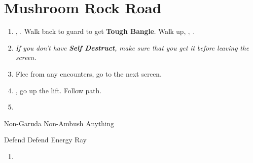 \chapter{Mushroom Rock Road}

\begin{enumerate}
	\item \sd, \cs. Walk back to guard to get \textbf{Tough Bangle}. Walk up, \sd, \sd.
	\item \textit{If you don't have \textbf{Self Destruct}, make sure that you get it before leaving the screen.}
	\item Flee from any encounters, go to the next screen.
	\item \save, go up the lift. Follow path.
	\item \formation{\tidus}{\wakka}{\auron}
\end{enumerate}
\begin{battle}{Non-Garuda Non-Ambush Anything}
	\begin{itemize}
		\switch{\tidus}{\kimahri}
		\kimahrif Defend
		\wakkaf Defend
		\switch{\auron}{\yuna}
		\summon{\valefor}
		\valeforf Energy Ray
	\end{itemize}
\end{battle}
\begin{enumerate}[resume]
	\item \formation{\tidus}{\wakka}{\auron}
\end{enumerate}
\vfill
